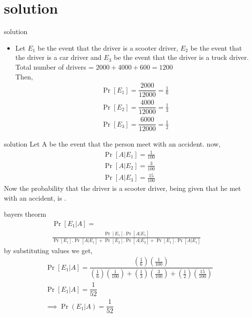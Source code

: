 \documentclass{beamer}
\begin{document}
\section{solution}
\begin{frame}{solution}
    \begin{itemize}
        \item  Let $ E_1$ be the event that the driver is a scooter driver, $E_2$ be the event that the driver is a car driver and $E_3$ be the event that the driver is a truck driver.\\
 Total number of drivers = $2000+4000+600=1200$\\
 Then,\\
 \begin{align}
  & { \Pr[E_1]=\dfrac{2000}{12000}=\frac{1}{6}}\\[8pt]
  &{\Pr[E_2]=\dfrac{4000}{12000}=\frac{1}{3}}\\[8pt]
  &{\Pr[E_3]=\dfrac{6000}{12000}=\frac{1}{2}}
  \end{align}
  \end{itemize}
\end{frame}
\begin{frame}{solution}
     Let A be the event that the person meet with an accident.
   now,\\
   \begin{align}
    &{ \Pr[A|E_1]=\frac{1}{100}}\\[8pt] 
    &{\Pr[A|E_2]=\frac{3}{100}}\\[8pt]
    &{\Pr[A|E_3]=\frac{15}{100}}
    \end{align}
    Now the probability that the driver is a scooter driver, being given that 
    he met with an accident, is \Pr[$E_1|A$].\\
\end{frame}
\begin{frame}{bayers theorm }
\begin{multline}
     \Pr[E_1|A]=\\\frac{\Pr[E_1].\Pr[A|E_1]}{\Pr[E_1].\Pr[A|E_1]+\Pr[E_2].\Pr[A|E_2]+\Pr[E_1].\Pr[A|E_1]}
  \end{multline}
  by substituting values we get,
  \begin{align}
  & { \Pr[E_1|A]= \dfrac{(\frac{1}{6})(\frac{1}{100})}{(\frac{1}{6})(\frac{1}{100})+(\frac{1}{3})(\frac{3}{100})+(\frac{1}{2})(\frac{15}{100})}}\\[8pt]
  &{ \Pr[E_1|A]= \dfrac{1}{52}}\\[8pt]
  &{\implies \Pr(E_1|A)=\dfrac{1}{52}}
  \end{align}
    
\end{frame}
\end{document}
